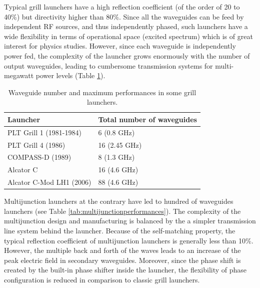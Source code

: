 Typical grill launchers have a high reflection coefficient (of the order of 20 to 40\%) but directivity higher than 80\%. Since all the waveguides can be feed by independent RF sources, and thus independently phased, such launchers have a wide flexibility in terms of operational space (excited spectrum) which is of great interest for physics studies. However, since each waveguide is independently power fed, the complexity of the launcher grows enormously with the number of output waveguides, leading to cumbersome transmission systems for multi-megawatt power levels (Table \ref{tab:grillperformances}). 

\begin{table}
	{
		\begin{tabular}{| p{6cm} | p{5cm} |}
			\hline 
			Launcher & Total number of waveguides \\
			\hline \hline
PLT Grill 1 (1981-1984)  \parencite{Stevens1988} & 6 (0.8 GHz) \\
			\hline
PLT Grill 4 (1986) \parencite{Stevens1988} & 16 (2.45 GHz) \\
			\hline
COMPASS-D (1989) & 8 (1.3 GHz) \\
			\hline
Alcator C \parencite{Porkolab1984a} & 16 (4.6 GHz) \\
			\hline
Alcator C-Mod LH1 (2006) & 88 (4.6 GHz) \\
			\hline
		\end{tabular}
	}
\caption{Waveguide number and maximum performances in some grill launchers.}
\label{tab:grillperformances}
\end{table}

Multijunction launchers at the contrary have led to hundred of waveguides launchers (see Table \ref{tab:multijunctionperformances}). The complexity of the multijunction design and manufacturing is balanced by the a simpler transmission line system behind the launcher. Because of the self-matching property, the typical reflection coefficient of multijunction launchers is generally less than 10\%. However, the multiple back and forth of the waves leads to an increase of the peak electric field in secondary waveguides. Moreover, since the phase shift is created by the built-in phase shifter inside the launcher, the flexibility of phase configuration is reduced in comparison to classic grill launchers. 

